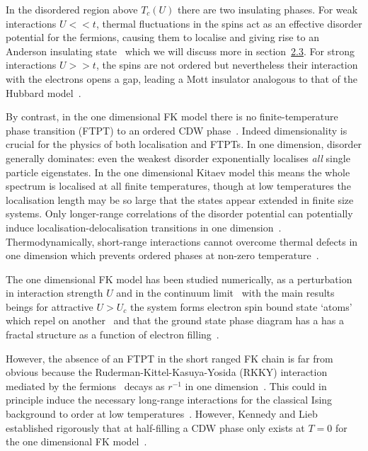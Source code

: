 In the disordered region above \(T_c(U)\) there are two insulating phases. For weak interactions \(U << t\), thermal fluctuations in the spins act as an effective disorder potential for the fermions, causing them to localise and giving rise to an Anderson insulating state~\autocite{andersonAbsenceDiffusionCertain1958} which we will discuss more in section~\protect\hyperlink{bg-disorder-and-localisation}{2.3}. For strong interactions \(U >> t\), the spins are not ordered but nevertheless their interaction with the electrons opens a gap, leading a Mott insulator analogous to that of the Hubbard model~\autocite{brandtThermodynamicsCorrelationFunctions1989}.

By contrast, in the one dimensional FK model there is no finite-temperature phase transition (FTPT) to an ordered CDW phase~\autocite{liebAbsenceMottTransition1968}. Indeed dimensionality is crucial for the physics of both localisation and FTPTs. In one dimension, disorder generally dominates: even the weakest disorder exponentially localises \emph{all} single particle eigenstates. In the one dimensional Kitaev model this means the whole spectrum is localised at all finite temperatures, though at low temperatures the localisation length may be so large that the states appear extended in finite size systems. Only longer-range correlations of the disorder potential can potentially induce localisation-delocalisation transitions in one dimension~\autocite{aubryAnalyticityBreakingAnderson1980,dassarmaLocalizationMobilityEdges1990,dunlapAbsenceLocalizationRandomdimer1990}. Thermodynamically, short-range interactions cannot overcome thermal defects in one dimension which prevents ordered phases at non-zero temperature~\autocite{goldshteinPurePointSpectrum1977,abrahamsScalingTheoryLocalization1979,kramerLocalizationTheoryExperiment1993}.

The one dimensional FK model has been studied numerically, as a perturbation in interaction strength \(U\) and in the continuum limit~\autocite{bursillOneDimensionalContinuum1994} with the main results beings for attractive \(U > U_c\) the system forms electron spin bound state `atoms' which repel on another~\autocite{gruberGroundStateEnergyLowTemperature1993} and that the ground state phase diagram has a has a fractal structure as a function of electron filling~\autocite{freericksTwostateOnedimensionalSpinless1990}.

However, the absence of an FTPT in the short ranged FK chain is far from obvious because the Ruderman-Kittel-Kasuya-Yosida (RKKY) interaction mediated by the fermions~\autocite{kasuyaTheoryMetallicFerro1956,rudermanIndirectExchangeCoupling1954,vanvleckNoteInteractionsSpins1962,yosidaMagneticPropertiesCuMn1957} decays as \(r^{-1}\) in one dimension~\autocite{rusinCalculationRKKYRange2017}. This could in principle induce the necessary long-range interactions for the classical Ising background to order at low temperatures~\autocite{thoulessLongRangeOrderOneDimensional1969,peierlsIsingModelFerromagnetism1936}. However, Kennedy and Lieb established rigorously that at half-filling a CDW phase only exists at \(T = 0\) for the one dimensional FK model~\autocite{kennedyItinerantElectronModel1986}.


